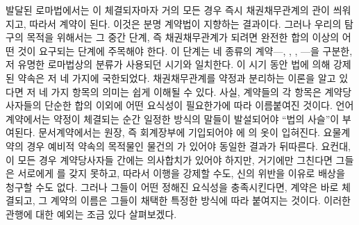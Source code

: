 발달된 로마법에서는
이 체결되자마자 거의 모든 경우
즉시
채권채무관계의 관이 씌워지고, 따라서 계약이 된다.
이것은 분명 계약법이 지향하는 결과이다.
그러나 우리의 탐구의 목적을 위해서는
그 중간 단계, 즉 채권채무관계가 되려면 완전한 합의 이상의 어떤 것이
요구되는 단계에 주목해야 한다.
이 단계는
네 종류의 계약---, , , ---을 구분한,
저 유명한 로마법상의 분류가 사용되던 시기와 일치한다.
이 시기 동안 법에 의해 강제된 약속은 저 네 가지에 국한되었다.
채권채무관계를 약정과 분리하는 이론을 알고 있다면
저 네 가지 항목의 의미는
쉽게 이해될 수 있다.
사실,
계약들의 각 항목은
계약당사자들의 단순한 합의 이외에 어떤 요식성이 필요한가에 따라
이름붙여진 것이다.
언어계약에서는 약정이 체결되는 순간
일정한 방식의 말들이 발설되어야 ``법의 사슬''이 부여된다.
문서계약에서는
원장, 즉 회계장부에 기입되어야
에 의 옷이 입혀진다.
요물계약의 경우
예비적 약속의 목적물인
물건의 가 있어야 동일한 결과가 뒤따른다.
요컨대,
이 모든 경우
계약당사자들 간에는 의사합치가 있어야 하지만,
거기에만 그친다면 그들은 서로에게 를 갖지 못하고,
따라서 이행을 강제할 수도,
신의 위반을 이유로 배상을 청구할 수도 없다.
그러나 그들이 어떤 정해진 요식성을 충족시킨다면,
계약은 바로 체결되고,
그 계약의 이름은 그들이 채택한 특정한 방식에 따라 붙여지는 것이다.
이러한 관행에 대한 예외는 조금 있다 살펴보겠다.

